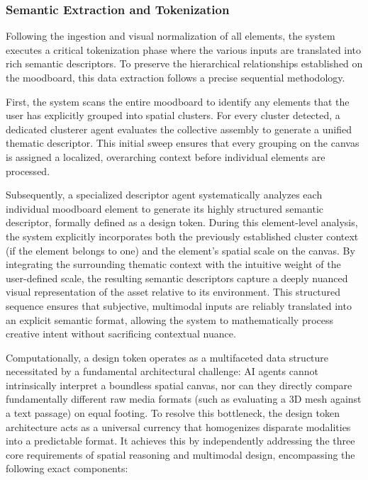 \subsubsection{Semantic Extraction and Tokenization}

Following the ingestion and visual normalization of all elements, the system executes a critical tokenization phase where the various inputs are translated into rich semantic descriptors. To preserve the hierarchical relationships established on the moodboard, this data extraction follows a precise sequential methodology.

First, the system scans the entire moodboard to identify any elements that the user has explicitly grouped into spatial clusters. For every cluster detected, a dedicated clusterer agent evaluates the collective assembly to generate a unified thematic descriptor. This initial sweep ensures that every grouping on the canvas is assigned a localized, overarching context before individual elements are processed. 

Subsequently, a specialized descriptor agent systematically analyzes each individual moodboard element to generate its highly structured semantic descriptor, formally defined as a design token. During this element-level analysis, the system explicitly incorporates both the previously established cluster context (if the element belongs to one) and the element's spatial scale on the canvas. By integrating the surrounding thematic context with the intuitive weight of the user-defined scale, the resulting semantic descriptors capture a deeply nuanced visual representation of the asset relative to its environment. This structured sequence ensures that subjective, multimodal inputs are reliably translated into an explicit semantic format, allowing the system to mathematically process creative intent without sacrificing contextual nuance.

Computationally, a design token operates as a multifaceted data structure necessitated by a fundamental architectural challenge: AI agents cannot intrinsically interpret a boundless spatial canvas, nor can they directly compare fundamentally different raw media formats (such as evaluating a 3D mesh against a text passage) on equal footing. To resolve this bottleneck, the design token architecture acts as a universal currency that homogenizes disparate modalities into a predictable format. It achieves this by independently addressing the three core requirements of spatial reasoning and multimodal design, encompassing the following exact components:

